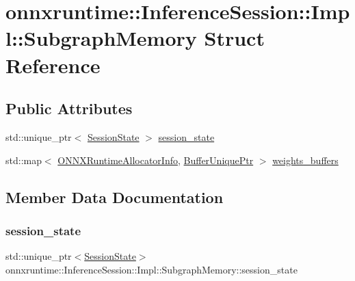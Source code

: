 \hypertarget{structonnxruntime_1_1InferenceSession_1_1Impl_1_1SubgraphMemory}{}\section{onnxruntime\+:\+:Inference\+Session\+:\+:Impl\+:\+:Subgraph\+Memory Struct Reference}
\label{structonnxruntime_1_1InferenceSession_1_1Impl_1_1SubgraphMemory}
\subsection*{Public Attributes}
\begin{DoxyCompactItemize}
\item 
std\+::unique\+\_\+ptr$<$ \mbox{\hyperlink{classonnxruntime_1_1SessionState}{Session\+State}} $>$ \mbox{\hyperlink{structonnxruntime_1_1InferenceSession_1_1Impl_1_1SubgraphMemory_a97facaf4c3fbd41ee98c7ae1f02795d5}{session\+\_\+state}}
\item 
std\+::map$<$ \mbox{\hyperlink{structONNXRuntimeAllocatorInfo}{O\+N\+N\+X\+Runtime\+Allocator\+Info}}, \mbox{\hyperlink{namespaceonnxruntime_acd830c816d6e0699b671f8ba79bb48f9}{Buffer\+Unique\+Ptr}} $>$ \mbox{\hyperlink{structonnxruntime_1_1InferenceSession_1_1Impl_1_1SubgraphMemory_a96a959ef483da22b2ad74c5805f69f1d}{weights\+\_\+buffers}}
\end{DoxyCompactItemize}


\subsection{Member Data Documentation}
\mbox{\label{structonnxruntime_1_1InferenceSession_1_1Impl_1_1SubgraphMemory_a97facaf4c3fbd41ee98c7ae1f02795d5}} 
\subsubsection{\texorpdfstring{session\+\_\+state}{session\_state}}
{\footnotesize\ttfamily std\+::unique\+\_\+ptr$<$\mbox{\hyperlink{classonnxruntime_1_1SessionState}{Session\+State}}$>$ onnxruntime\+::\+Inference\+Session\+::\+Impl\+::\+Subgraph\+Memory\+::session\+\_\+state}

